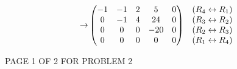 \documentclass[12pt]{article}
\newenvironment{problem}[2][Problem]
{
	\begin{trivlist} 
		\item[\hskip \labelsep {\bfseries #1 #2:}]
	}
{
	\end{trivlist}
	}
\newenvironment{solution}[1][Solution]
{
	\begin{trivlist} 
		\item[\hskip \labelsep {\itshape #1:}]
	}
	{
	\end{trivlist}
}
\begin{document}
\begin{problem}{2}
\begin{solution}
\begin{align*}
\rightarrow & \begin{pmatrix}  -1&-1&2&5&0 \\ 0&-1&4&24&0\\ 0&0&0&-20&0 \\0&0&0&0&0 \end{pmatrix} & \begin{matrix} (R_4 \leftrightarrow R_1)\hphantom{1}\\ (R_3 \leftrightarrow R_2)\hphantom{1}\\ (R_2 \leftrightarrow R_3)\hphantom{1}\\ (R_1 \leftrightarrow R_4)\hphantom{1}\end{matrix} \\
\end{align*}
\vfill
\centerline{PAGE 1 OF 2 FOR PROBLEM 2}
\end{solution}
\end{problem}
\end{document}
